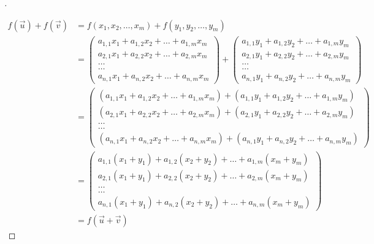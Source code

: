 \documentclass[12pt]{article}
\theoremstyle{break}
\newenvironment{demo}[1][\proofname]{%
  \begin{proof}[#1]$ $\newline
}{%
  \end{proof}
}
\begin{document}
\begin{demo}
$$
\begin{aligned}
f(\vec{u})+f(\vec{v}) & =f\left(x_{1}, x_{2}, \ldots, x_{m}\right)+f\left(y_{1}, y_{2}, \ldots, y_{m}\right) \\
& =\left(\begin{array}{c}
a_{1,1} x_{1}+a_{1,2} x_{2}+\ldots+a_{1, m} x_{m} \\
a_{2,1} x_{1}+a_{2,2} x_{2}+\ldots+a_{2, m} x_{m} \\
\ldots \\
\ldots \\
a_{n, 1} x_{1}+a_{n, 2} x_{2}+\ldots+a_{n, m} x_{m}
\end{array}\right)+\left(\begin{array}{c}
a_{1,1} y_{1}+a_{1,2} y_{2}+\ldots+a_{1, m} y_{m} \\
a_{2,1} y_{1}+a_{2,2} y_{2}+\ldots+a_{2, m} y_{m} \\
\ldots \\
\ldots \\
a_{n, 1} y_{1}+a_{n, 2} y_{2}+\ldots+a_{n, m} y_{m}
\end{array}\right) \\
& =\left(\begin{array}{c}
\left(a_{1,1} x_{1}+a_{1,2} x_{2}+\ldots+a_{1, m} x_{m}\right)+\left(a_{1,1} y_{1}+a_{1,2} y_{2}+\ldots+a_{1, m} y_{m}\right) \\
\left(a_{2,1} x_{1}+a_{2,2} x_{2}+\ldots+a_{2, m} x_{m}\right)+\left(a_{2,1} y_{1}+a_{2,2} y_{2}+\ldots+a_{2, m} y_{m}\right) \\
\ldots \\
\ldots \\
\left(a_{n, 1} x_{1}+a_{n, 2} x_{2}+\ldots+a_{n, m} x_{m}\right)+\left(a_{n, 1} y_{1}+a_{n, 2} y_{2}+\ldots+a_{n, m} y_{m}\right)
\end{array}\right) \\
& =\left(\begin{array}{c}
a_{1,1}\left(x_{1}+y_{1}\right)+a_{1,2}\left(x_{2}+y_{2}\right)+\ldots+a_{1, m}\left(x_{m}+y_{m}\right) \\
a_{2,1}\left(x_{1}+y_{1}\right)+a_{2,2}\left(x_{2}+y_{2}\right)+\ldots+a_{2, m}\left(x_{m}+y_{m}\right) \\
\ldots \\
\ldots \\
a_{n, 1}\left(x_{1}+y_{1}\right)+a_{n, 2}\left(x_{2}+y_{2}\right)+\ldots+a_{n, m}\left(x_{m}+y_{m}\right)
\end{array}\right) \\
& =f(\vec{u}+\vec{v})
\end{aligned}
$$


\end{demo}
\end{document}
